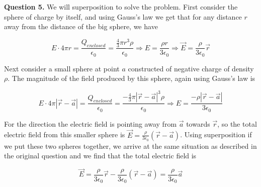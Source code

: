 \documentclass[letterpaper, reqno,11pt]{article}
\begin{document}
{\noindent\bf Question 5.} We will superposition to solve the problem. First consider the sphere of charge by itself, and using Gauss's law we get that for any distance $r$ away from the distance of the big sphere, we have

$$
    E\cdot 4\pi r=\frac{Q_{enclosed}}{\epsilon_0}=\frac{\frac43\pi r^3\rho}{\epsilon_0}\Rightarrow E=\frac{\rho r}{3\epsilon_0}\Rightarrow \vec E=\frac{\rho}{3\epsilon_0}\vec r
$$

Next consider a small sphere at point $a$ constructed of negative charge of density $\rho$. The magnitude of the field produced by this sphere, again using Gauss's law is 

$$
    E\cdot 4\pi |\vec r-\vec a|=\frac{Q_{enclosed}}{\epsilon_0}=\frac{-\frac43\pi |\vec r-\vec a|^3\rho}{\epsilon_0}\Rightarrow E=\frac{-\rho |\vec r-\vec a|}{3\epsilon_0}
$$

For the direction the electric field is pointing away from $\vec a$ towards $\vec r$, so the total electric field from this smaller sphere is $\vec E=\frac{\rho}{3\epsilon_0}(\vec r-\vec a)$. Using superposition if we put these two spheres together, we arrive at the same situation as described in the original question and we find that the total electric field is 

$$
    \vec E=\frac{\rho}{3\epsilon_0}\vec r-\frac{\rho}{3\epsilon_0}(\vec r-\vec a)=\frac{\rho}{3\epsilon_0}\vec a
$$
\end{document}
